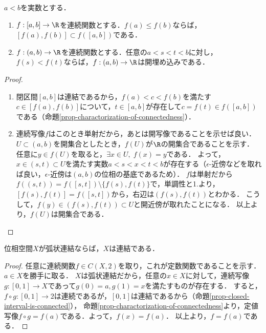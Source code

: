 \documentclass[uplatex,dvipdfmx]{jsreport}
\begin{document}
\begin{corollary}[区間上の単調写像は開埋め込み]\label{cor-monotone-map-over-intervals}
    $a<b$を実数とする．
    \begin{enumerate}
        \item $f:[a,b]\to\R$を連続関数とする．$f(a)\le f(b)$ならば，$[f(a),f(b)]\subset f([a,b])$である．
        \item $f:(a,b)\to\R$を連続関数とする．任意の$a<s<t<b$に対し，$f(s)<f(t)$ならば，$f:(a,b)\to\R$は開埋め込みである．
    \end{enumerate}
\end{corollary}
\begin{proof}\mbox{}
    \begin{enumerate}
        \item 閉区間$[a,b]$は連結であるから，$f(a)<c<f(b)$を満たす$c\in[f(a),f(b)]$について，$t\in[a,b]$が存在して$c=f(t)\in f([a,b])$である（命題\ref{prop-charactorization-of-connectedness}）．
        \item 連続写像$f$はこのとき単射だから，あとは開写像であることを示せば良い．
        $U\subset(a,b)$を開集合としたとき，$f(U)$が$\R$の開集合であることを示す．
        任意に$y\in f(U)$を取ると，$\exists x\in U,\; f(x)=y$である．
        よって，$x\in(s,t)\subset U$を満たす実数$a<s<x<t<b$が存在する（$\epsilon$-近傍などを取れば良い，$\epsilon$-近傍は$(a,b)$の位相の基底であるため）．
        $f$は単射だから$f((s,t))=f([s,t])\setminus\{f(s),f(t)\}$で，単調性と1.より，$[f(s),f(t)]=f([s,t])$から，右辺は$(f(s),f(t))$とわかる．
        こうして，$f(y)\in(f(s),f(t))\subset U$と開近傍が取れたことになる．
        以上より，$f(U)$は開集合である．
    \end{enumerate}
\end{proof}

\begin{corollary}[弧状連結ならば連結]
    位相空間$X$が弧状連結ならば，$X$は連結である．
\end{corollary}
\begin{proof}
    任意に連続関数$f\in C(X,2)$を取り，これが定数関数であることを示す．
    $a\in X$を勝手に取る．
    $X$は弧状連結だから，任意の$x\in X$に対して，連続写像$g:[0,1]\to X$であって$g(0)=a,g(1)=x$を満たすものが存在する．
    すると，$f\circ g:[0,1]\to 2$は連続であるが，$[0,1]$は連結であるから（命題\ref{prop-closed-interval-is-connected}），
    命題\ref{prop-charactorization-of-connectedness}より，定値写像$f\circ g=f(a)$である．よって，$f(x)=f(a)$．
    以上より，$f=f(a)$である．
\end{proof}
\end{document}
